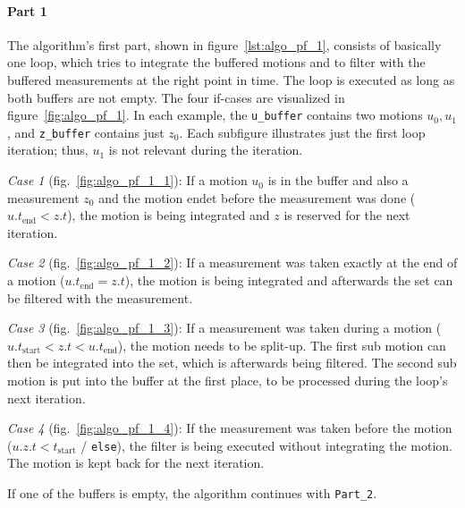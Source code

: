 \paragraph{Part 1} The algorithm's first part, shown in figure~\ref{lst:algo_pf_1}, consists of basically one loop, which tries to integrate the buffered motions and to filter with the buffered measurements at the right point in time. The loop is executed as long as both buffers are not empty. The four if-cases are visualized in figure~\ref{fig:algo_pf_1}. In each example, the \texttt{u\_buffer} contains two motions $u_0, u_1$, and \texttt{z\_buffer} contains just $z_0$. Each subfigure illustrates just the first loop iteration; thus, $u_1$ is not relevant during the iteration.

\emph{Case 1} (fig.\ \ref{fig:algo_pf_1_1}): If a motion $u_0$ is in the buffer and also a measurement $z_0$ and the motion endet before the measurement was done ($u.{t_\text{end}} < z.t$), the motion is being integrated and $z$ is reserved for the next iteration.

\emph{Case 2} (fig.\ \ref{fig:algo_pf_1_2}): If a measurement was taken exactly at the end of a motion ($u.{t_\text{end}} = z.t$), the motion is being integrated and afterwards the set can be filtered with the measurement.

\emph{Case 3} (fig.\ \ref{fig:algo_pf_1_3}): If a measurement was taken during a motion ($u.{t_\text{start}} < z.t < u.{t_\text{end}}$), the motion needs to be split-up. The first sub motion can then be integrated into the set, which is afterwards being filtered. The second sub motion is put into the buffer at the first place, to be processed during the loop's next iteration.

\emph{Case 4} (fig.\ \ref{fig:algo_pf_1_4}): If the measurement was taken before the motion ($u.{z.t < t_\text{start}}$ / \texttt{else}), the filter is being executed without integrating the motion. The motion is kept back for the next iteration.

If one of the buffers is empty, the algorithm continues with \texttt{Part\_2}.

